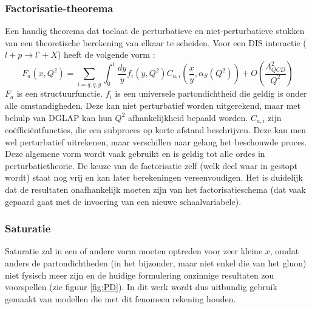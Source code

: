 \documentclass[a4paper,11pt]{article}
\numberwithin{equation}{section} %
\begin{document}
    \subsubsection{Factorisatie-theorema}
Een handig theorema dat toelaat de perturbatieve en niet-perturbatieve stukken van een  theoretische berekening van elkaar te scheiden.
Voor een DIS interactie ($l+p\rightarrow l’+X$) heeft de volgende vorm \cite{Martin}: 
\begin{equation}
F_a(x, Q^2) = \sum_{i=q,q,g} \int_0^1 \frac{dy}{y} f_i(y, Q^2) C_{a,i} \left( \frac{x}{y},\alpha_S(Q^2) \right) + O \left( \frac{\Lambda_{QCD}^2}{Q^2} \right) 
\end{equation}
$F_a$ is een structuurfunctie.
$f_i$ is een universele partondichtheid die geldig is onder alle omstandigheden.
Deze kan niet perturbatief worden uitgerekend, maar met behulp van DGLAP kan hun $Q^2$ afhankelijkheid bepaald worden.
$C_{a,i}$ zijn coëfficiëntfuncties, die een subproces op korte afstand beschrijven.
Deze kan men wel perturbatief uitrekenen, maar verschillen naar gelang het beschouwde proces.
Deze algemene vorm wordt vaak gebruikt en is geldig tot alle ordes in perturbatietheorie.
De keuze van de factorisatie zelf (welk deel waar in gestopt wordt) staat nog vrij en kan later berekeningen vereenvoudigen.
Het is duidelijk dat de resultaten onafhankelijk moeten zijn van het factorisatieschema (dat vaak gepaard gaat met de invoering van een nieuwe schaalvariabele).

    \subsubsection{Saturatie} \label{sec:Saturatie}
Saturatie zal in een of andere vorm moeten optreden voor zeer kleine $x$, omdat anders de partondichtheden (in het bijzonder, maar niet enkel die van het gluon) niet fysisch meer zijn en de huidige formulering onzinnige resultaten zou voorspellen (zie figuur \ref{fig:PD}).
In dit werk wordt dus uitbundig gebruik gemaakt van modellen die met dit fenomeen rekening houden.
\end{document}
